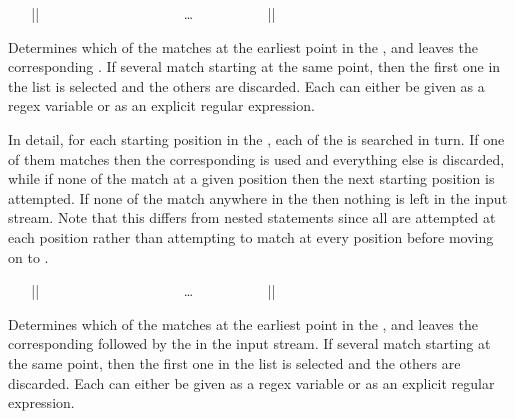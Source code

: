 \documentclass[oneside]{book}
\begin{document}
\begin{function}{\regexMatchCase}
\begin{syntax}
~ ~ |{|
~ ~ ~ ~  
~ ~ ~ ~  
~ ~ ~ ~ \ldots
~ ~ ~ ~  
~ ~ |}| 
\end{syntax}
Determines which of the  matches at the earliest
point in the , and leaves the corresponding .
If several  match starting at the same point,
then the first one in the list is selected and the others are discarded.
Each  can either be given as a regex variable or as an explicit
regular expression.
\par
In detail, for each starting position in the , each
of the  is searched in turn.  If one of them matches
then the corresponding  is used and everything else is
discarded, while if none of the  match at a given
position then the next starting position is attempted.  If none of
the  match anywhere in the  then
nothing is left in the input stream.  Note that this differs from
nested  statements since all  are
attempted at each position rather than attempting to match
 at every position before moving on to .
\end{function}

\begin{function}{\regexMatchCaseT}
\begin{syntax}
~ ~ |{|
~ ~ ~ ~  
~ ~ ~ ~  
~ ~ ~ ~ \ldots
~ ~ ~ ~  
~ ~ |}| 
~ ~ 
\end{syntax}
Determines which of the  matches at the
earliest point in the , and leaves the
corresponding  followed by the  in the
input stream. If several  match starting at the same
point, then the first one in the list is selected and the others are
discarded. Each  can either be given
as a regex variable or as an explicit regular expression.
\end{function}
\end{document}
